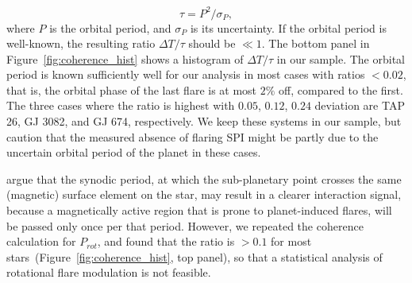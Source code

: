 \documentclass[twocolumn]{aastex631}
\begin{document}
\begin{equation}
    \tau = P^2 / \sigma_P,
\end{equation}
where $P$ is the orbital period, and $\sigma_P$ is its uncertainty.
If the orbital period is well-known, the resulting ratio $\Delta T/\tau$ should be $\ll 1$. The bottom panel in Figure~\ref{fig:coherence_hist} shows a histogram of $\Delta T/\tau$ in our sample. The orbital period is known sufficiently well for our analysis in most cases with ratios $<0.02$, that is, the orbital phase of the last flare is at most $2\%$ off, compared to the first. The three cases where the ratio is highest with $0.05$, $0.12$, $0.24$ deviation are TAP 26, GJ 3082, and GJ 674, respectively. We keep these systems in our sample, but caution that the measured absence of flaring SPI might be partly due to the uncertain orbital period of the planet in these cases.


\citet{fischer2019timevariable} argue that the synodic period, at which the sub-planetary point crosses the same (magnetic) surface element on the star, may result in a clearer interaction signal, because a magnetically active region that is prone to planet-induced flares, will be passed only once per that period. However, we repeated the coherence calculation for $P_{rot}$, and found that the ratio is $>0.1$ for most stars~(Figure~\ref{fig:coherence_hist}, top panel), so that a statistical analysis of rotational flare modulation is not feasible. %

\end{document}
